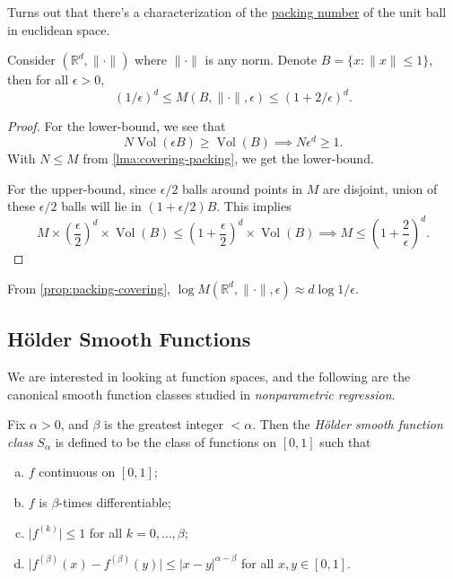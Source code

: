 Turns out that there's a characterization of the \hyperref[def:packing-number]{packing number} of the unit ball in euclidean space.

\begin{proposition}\label{prop:packing-covering}
	Consider \((\mathbb{R} ^d, \lVert \cdot \rVert )\) where \(\lVert \cdot \rVert \) is any norm. Denote \(B = \{ x \colon \lVert x \rVert \leq 1 \} \), then for all \(\epsilon > 0\),
	\[
		(1 / \epsilon) ^d \leq M(B, \lVert \cdot \rVert , \epsilon ) \leq (1 + 2 / \epsilon )^d.
	\]
\end{proposition}
\begin{proof}
	For the lower-bound, we see that
	\[
		N \mathop{\mathrm{Vol}}(\epsilon B) \geq \mathop{\mathrm{Vol}}(B)
		\implies N \epsilon ^d \geq 1.
	\]
	With \(N \leq M\) from \autoref{lma:covering-packing}, we get the lower-bound.

	For the upper-bound, since \(\epsilon / 2\) balls around points in \(M\) are disjoint, union of these \(\epsilon / 2\) balls will lie in \((1 + \epsilon / 2)B\). This implies
	\[
		M \times \left( \frac{\epsilon}{2} \right) ^d \times \mathop{\mathrm{Vol}}(B)
		\leq \left( 1 + \frac{\epsilon}{2} \right) ^d \times \mathop{\mathrm{Vol}}(B)
		\implies M \leq \left( 1 + \frac{2}{\epsilon } \right) ^d.
	\]
\end{proof}

\begin{note}
	From \autoref{prop:packing-covering}, \(\log M(\mathbb{R} ^d, \lVert \cdot \rVert , \epsilon ) \approx d \log 1 / \epsilon \).
\end{note}

\subsection{Hölder Smooth Functions}
We are interested in looking at function spaces, and the following are the canonical smooth function classes studied in \emph{nonparametric regression}.

\begin{definition}\label{def:Holder-smooth-function-class}
	Fix \(\alpha > 0\), and \(\beta \) is the greatest integer \(< \alpha \). Then the \emph{Hölder smooth function class} \(S_\alpha \) is defined to be the class of functions on \([0, 1]\) such that
	\begin{enumerate}[(a)]
		\item \(f\) continuous on \([0, 1]\);
		\item \(f\) is \(\beta \)-times differentiable;
		\item \(\vert f^{(k)} \vert \leq 1\) for all \(k = 0, \dots , \beta \);
		\item \(\vert f^{(\beta )}(x) - f^{(\beta )}(y) \vert \leq \vert x - y \vert ^{\alpha - \beta }\) for all \(x, y \in [0, 1]\).
	\end{enumerate}
\end{definition}


